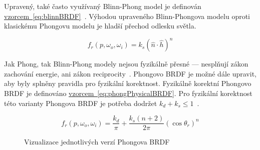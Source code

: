 \documentclass[czech,master]{diploma}
\newcommand{\uvec}[1]{\hat{#1}}
\newcommand{\point}{p}
\newcommand{\brdf}{f_r\left(\point,\omega_{o},\omega_{i}\right)}
\newcommand{\normVec}{\uvec{n}}
\newcommand{\halfVec}{\uvec{h}}
\begin{document}
Upravený, také často využívaný Blinn-Phong model je definován \hyperref[eq:blinnBRDF]{vzorcem~\ref{eq:blinnBRDF}}~\cite{BlinnPhong1977}. Výhodou upraveného Blinn-Phongova modelu oproti klasickému Phongovu modelu je hladší přechod odlesku světla.

\begin{equation} \label{eq:blinnBRDF}
  \brdf = k_s{(\normVec\cdot\halfVec)}^{n}
\end{equation}

Jak Phong, tak Blinn-Phong modely nejsou fyzikálně přesné --- nesplňují zákon zachování energie, ani zákon reciprocity~\cite{BRDFOverview}. Phongovo BRDF je možné dále upravit, aby byly splněny pravidla pro fyzikální korektnost. Fyzikálně korektní Phongovo BRDF je definováno \hyperref[eq:phongPhysicalBRDF]{vzorcem~\ref{eq:phongPhysicalBRDF}}. Pro fyzikální korektnost této varianty Phongova BRDF je potřeba dodržet \(k_d + k_s \leq 1\)~\cite{LaFortunePhongBRDF}.

\begin{equation} \label{eq:phongPhysicalBRDF}
  \brdf = \frac{k_d}{\pi} +
  \frac{k_s\left(n+2\right)}{2\pi}{\left(\cos\theta_r\right)}^{n}
\end{equation}

\begin{figure}[ht]%
  \centering
  \qquad
  \qquad
  \caption{Vizualizace jednotlivých verzí Phongova BRDF}%
  \label{fig:finalrender}%
\end{figure}
\end{document}
